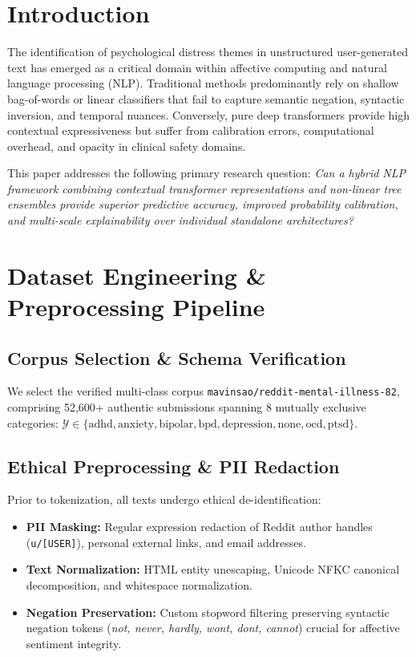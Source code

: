 \documentclass[conference]{IEEEtran}
\begin{document}
\section{Introduction}
The identification of psychological distress themes in unstructured user-generated text has emerged as a critical domain within affective computing and natural language processing (NLP). Traditional methods predominantly rely on shallow bag-of-words or linear classifiers that fail to capture semantic negation, syntactic inversion, and temporal nuances. Conversely, pure deep transformers provide high contextual expressiveness but suffer from calibration errors, computational overhead, and opacity in clinical safety domains.

This paper addresses the following primary research question:
\textit{Can a hybrid NLP framework combining contextual transformer representations and non-linear tree ensembles provide superior predictive accuracy, improved probability calibration, and multi-scale explainability over individual standalone architectures?}

\section{Dataset Engineering \& Preprocessing Pipeline}
\subsection{Corpus Selection \& Schema Verification}
We select the verified multi-class corpus \texttt{mavinsao/reddit-mental-illness-82}, comprising 52,600+ authentic submissions spanning 8 mutually exclusive categories: $\mathcal{Y} \in \{\text{adhd}, \text{anxiety}, \text{bipolar}, \text{bpd}, \text{depression}, \text{none}, \text{ocd}, \text{ptsd}\}$.

\subsection{Ethical Preprocessing \& PII Redaction}
Prior to tokenization, all texts undergo ethical de-identification:
\begin{itemize}
    \item \textbf{PII Masking:} Regular expression redaction of Reddit author handles (\texttt{u/[USER]}), personal external links, and email addresses.
    \item \textbf{Text Normalization:} HTML entity unescaping, Unicode NFKC canonical decomposition, and whitespace normalization.
    \item \textbf{Negation Preservation:} Custom stopword filtering preserving syntactic negation tokens (\textit{not, never, hardly, wont, dont, cannot}) crucial for affective sentiment integrity.
\end{itemize}
\end{document}
